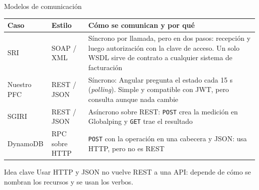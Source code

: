 \begin{frame}{Modelos de comunicación}
\footnotesize
\begin{tabularx}{\linewidth}{@{}l l X@{}}
\toprule
Caso & Estilo & Cómo se comunican y por qué \\
\midrule
SRI & SOAP / XML & Síncrono por llamada, pero en dos pasos: recepción y luego autorización con la clave de acceso. Un solo WSDL sirve de contrato a cualquier sistema de facturación \cite{sri_recepcion,sri_autorizacion} \\
Nuestro PFC & REST / JSON & Síncrono: Angular pregunta el estado cada 15 s (\emph{polling}). Simple y compatible con JWT, pero consulta aunque nada cambie \\
SGIRI & REST / JSON & Asíncrono sobre REST: \texttt{POST} crea la medición en Globalping y \texttt{GET} trae el resultado \\
DynamoDB & RPC sobre HTTP & \texttt{POST} con la operación en una cabecera y JSON: usa HTTP, pero no es REST \cite{aws_dynamodb_api} \\
\bottomrule
\end{tabularx}
\vspace{6pt}
\begin{block}{Idea clave}
Usar HTTP y JSON no vuelve REST a una API: depende de cómo se nombran los recursos y se usan los verbos.
\end{block}
\end{frame}
